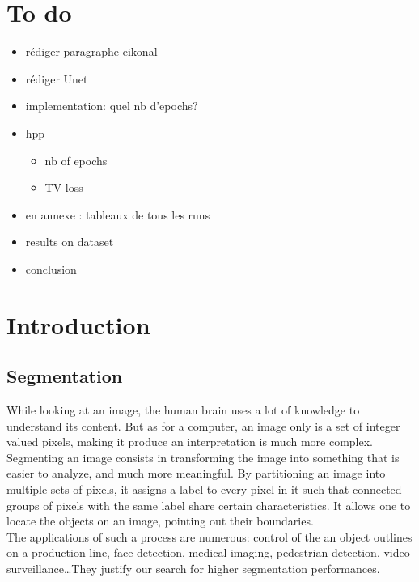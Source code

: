 \documentclass{article}
\begin{document}
\section*{To do}
\begin{itemize}
    \item rédiger paragraphe eikonal
    \item rédiger Unet
    \item implementation: quel nb d'epochs?
    \item hpp
    \begin{itemize}
        \item nb of epochs
        \item TV loss
    \end{itemize}
    \item en annexe : tableaux de tous les runs
    \item results on dataset
    \item conclusion
\end{itemize}

\section{Introduction}

    \subsection{Segmentation}
        While looking at an image, the human brain uses a lot of knowledge to understand its content. But as for a computer, an image only is a set of integer valued pixels, making it produce an interpretation is much more complex. Segmenting an image consists in transforming the image into something that is easier to analyze, and much more meaningful. By partitioning an image into multiple sets of pixels, it assigns a label to every pixel in it such that connected groups of pixels with the same label share certain characteristics. It allows one to locate the objects on an image, pointing out their boundaries.\\
        The applications of such a process are numerous: control of the an object outlines on a production line, face detection, medical imaging, pedestrian detection, video surveillance\ldots They justify our search for higher segmentation performances.
\end{document}
